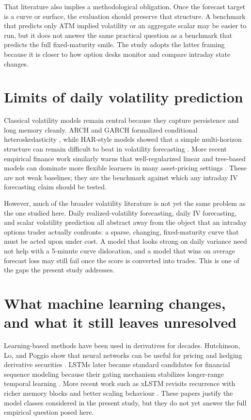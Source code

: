 \documentclass[12pt]{report}
\begin{document}
That literature also implies a methodological obligation. Once the forecast target is a curve or surface, the evaluation should preserve that structure. A benchmark that predicts only ATM implied volatility or an aggregate scalar may be easier to run, but it does not answer the same practical question as a benchmark that predicts the full fixed-maturity smile. The study adopts the latter framing because it is closer to how option desks monitor and compare intraday state changes.

\section{Limits of daily volatility prediction}
Classical volatility models remain central because they capture persistence and long memory cleanly. ARCH and GARCH formalized conditional heteroskedasticity \citep{engle1982,bollerslev1986}, while HAR-style models showed that a simple multi-horizon structure can remain difficult to beat in volatility forecasting \citep{corsi2009}. More recent empirical finance work similarly warns that well-regularized linear and tree-based models can dominate more flexible learners in many asset-pricing settings \citep{gu2020,heaton2017}. These are not weak baselines; they are the benchmark against which any intraday IV forecasting claim should be tested.

However, much of the broader volatility literature is not yet the same problem as the one studied here. Daily realized-volatility forecasting, daily IV forecasting, and scalar volatility prediction all abstract away from the object that an intraday options trader actually confronts: a sparse, changing, fixed-maturity curve that must be acted upon under cost. A model that looks strong on daily variance need not help with a 5-minute curve dislocation, and a model that wins on average forecast loss may still fail once the score is converted into trades. This is one of the gaps the present study addresses.

\section{What machine learning changes, and what it still leaves unresolved}
Learning-based methods have been used in derivatives for decades. Hutchinson, Lo, and Poggio show that neural networks can be useful for pricing and hedging derivative securities \citep{hutchinson1994}. LSTMs later became standard candidates for financial sequence modeling because their gating mechanism stabilizes longer-range temporal learning \citep{hochreiter1997,fischer2018}. More recent work such as xLSTM revisits recurrence with richer memory blocks and better scaling behaviour \citep{beck2024xlstm}. These papers justify the model classes considered in the present study, but they do not yet answer the full empirical question posed here.
\end{document}
